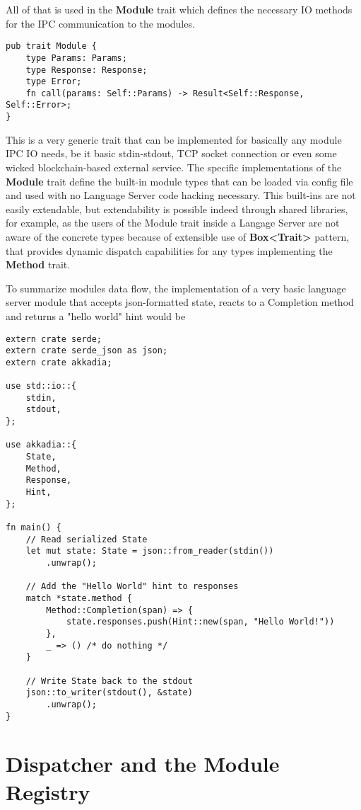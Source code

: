 All of that is used in the \textbf{Module} trait which defines the necessary IO methods for the IPC
communication to the modules.
\begin{verbatim}
pub trait Module {
    type Params: Params;
    type Response: Response;
    type Error;
    fn call(params: Self::Params) -> Result<Self::Response, Self::Error>;
}
\end{verbatim}
This is a very generic trait that can be implemented for basically any module IPC IO needs,
be it basic stdin-stdout, TCP socket connection or even some wicked blockchain-based external service.
The specific implementations of the \textbf{Module} trait define the built-in module types
that can be loaded via config file and used with no Language Server code hacking necessary.
This built-ins are not easily extendable, but extendability is possible indeed through
shared libraries, for example, as the users of the Module trait inside a Langage Server
are not aware of the concrete types because of extensible use of \textbf{Box<Trait>} pattern,
that provides dynamic dispatch capabilities for any types implementing the \textbf{Method} trait.

\newpage
To summarize modules data flow, the implementation of a very basic language server module
that accepts json-formatted state, reacts to a Completion method and returns a "hello world" hint would be
\begin{verbatim}
extern crate serde;
extern crate serde_json as json;
extern crate akkadia;

use std::io::{
    stdin,
    stdout,
};

use akkadia::{
    State,
    Method,
    Response,
    Hint,
};

fn main() {
    // Read serialized State
    let mut state: State = json::from_reader(stdin())
        .unwrap();

    // Add the "Hello World" hint to responses
    match *state.method {
        Method::Completion(span) => {
            state.responses.push(Hint::new(span, "Hello World!"))
        },
        _ => () /* do nothing */
    }

    // Write State back to the stdout
    json::to_writer(stdout(), &state)
        .unwrap();
}
\end{verbatim}

\section{Dispatcher and the Module Registry}


